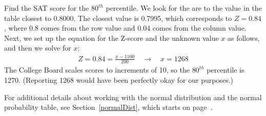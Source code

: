 \begin{examplewrap}
\begin{nexample}{Find the SAT score for the $80^{th}$ percentile.}
  We look for the are to the value in the table closest to 0.8000.
  The closest value is 0.7995, which corresponds to $Z = 0.84$,
  where 0.8 comes from the row value and 0.04 comes from the
  column value.
  Next, we set up the equation for the Z-score and the unknown
  value $x$ as follows, and then we solve for $x$:
  \begin{align*}
  Z = 0.84 = \frac{x - 1100}{200}
  \quad\to\quad x = 1268
  \end{align*}
  The College Board scales scores to increments of 10,
  so the $80^{th}$ percentile is 1270.
  (Reporting 1268 would have been perfectly okay for our purposes.)
\end{nexample}
\end{examplewrap}

For additional details about working with the normal distribution and the normal probability table, see Section~\ref{normalDist}, which starts on page~\pageref{normalDist}.

